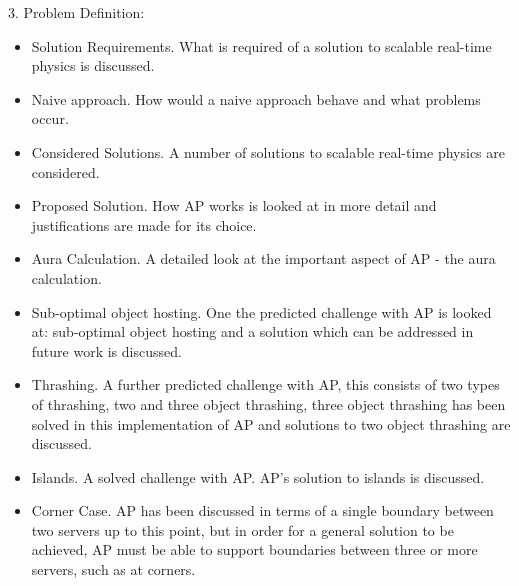 3. Problem Definition:
\begin{itemize}
	\item Solution Requirements. What is required of a solution to scalable real-time physics is discussed.
	\item Naive approach. How would a naive approach behave and what problems occur.
	\item Considered Solutions. A number of solutions to scalable real-time physics are considered.
	\item Proposed Solution. How AP works is looked at in more detail and justifications are made for its choice.
	\item Aura Calculation. A detailed look at the important aspect of AP - the aura calculation.
	\item Sub-optimal object hosting. One the predicted challenge with AP is looked at: sub-optimal object hosting and a solution which can be addressed in future work is discussed.
	\item Thrashing. A further predicted challenge with AP, this consists of two types of thrashing, two and three object thrashing, three object thrashing has been solved in this implementation of AP and solutions to two object thrashing are discussed.
	\item Islands. A solved challenge with AP. AP's solution to islands is discussed.
	\item Corner Case. AP has been discussed in terms of a single boundary between two servers up to this point, but in order for a general solution to be achieved, AP must be able to support boundaries between three or more servers, such as at corners.
\end{itemize}

